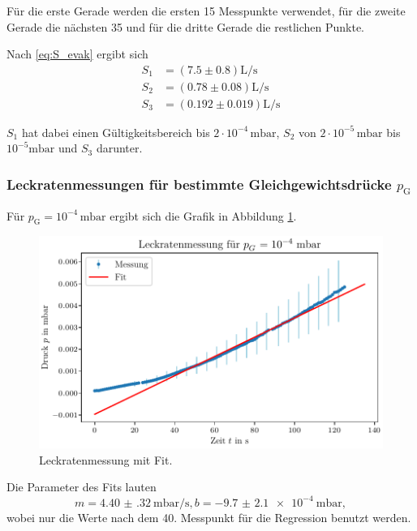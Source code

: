 Für die erste Gerade werden die ersten 15 Messpunkte verwendet, für die zweite Gerade die nächsten 35 und für die dritte Gerade die restlichen Punkte.

Nach \eqref{eq:S_evak} ergibt sich
\begin{align}
    S_1 &= (\num{7.5} \pm \num{0.8}) \si{\liter\per\second} \\
    S_2 &= (\num{0.78} \pm \num{0.08}) \si{\liter\per\second} \\
    S_3 &= (\num{0.192} \pm \num{0.019}) \si{\liter\per\second} 
\end{align}

$S_1$ hat dabei einen Gültigkeitsbereich bis $\num{2}\cdot 10^{-4} \, \si{\milli\bar}$, $S_2$ von $\num{2}\cdot 10^{-5} \, \si{\milli\bar}$ bis $10^{-5} \si{\milli\bar}$ und $S_3$ darunter.

\subsubsection{Leckratenmessungen für bestimmte Gleichgewichtsdrücke $p_\text{G}$}

Für $p_\text{G} = 10^{-4} \, \si{\milli\bar}$ ergibt sich die Grafik in Abbildung \ref{fig:TP_Leck_1e4}.

\begin{figure}[H]
    \centering
    \includegraphics[width=\textwidth]{plots/TP_Leck_1e4.pdf}
    \caption{Leckratenmessung mit Fit.}
    \label{fig:TP_Leck_1e4}
\end{figure}

Die Parameter des Fits lauten 
\begin{equation}
    m = \qty{4.40(32)}{\milli\bar\per\second}, b = \qty{-9.7(21)e-4}{\milli\bar},
\end{equation}
wobei nur die Werte nach dem 40. Messpunkt
für die Regression benutzt werden.

